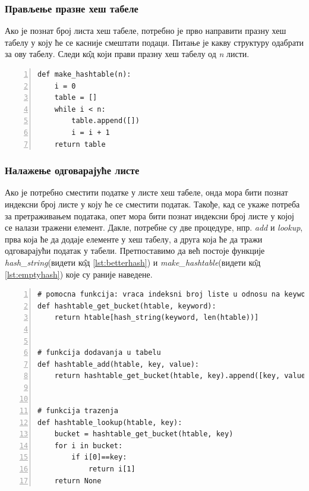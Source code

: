 
\subsubsection{Прављење празне хеш табеле}

Ако је познат број листа хеш табеле, потребно је прво направити празну хеш табелу у коју ће се касније смештати подаци. Питање је какву структуру одабрати за ову табелу. Следи к\^{о}д који прави празну хеш табелу од \emph{n} листи.

\begin{lstlisting}[caption=Празна хеш табела, label={lst:emptyhash}, numbers = left]
def make_hashtable(n):
    i = 0
    table = []
    while i < n:
        table.append([])
        i = i + 1
    return table
\end{lstlisting}

\subsubsection{Налажење одговарајуће листе}

Ако је потребно сместити податке у листе хеш табеле, онда мора бити познат индексни број листе у коју ће се сместити податак. Такође, кад се укаже потреба за  претраживањем података, опет мора бити познат индексни број листе у којој се налази тражени елемент. Дакле, потребне су две процедуре, нпр. \emph{add} и \emph{lookup}, прва која ће да додаје елементе у хеш табелу, а друга која ће да тражи одговарајући податак у табели. Претпоставимо да већ постоје функције \emph{hash\_string}(видети к\^{о}д \ref{lst:betterhash}) и \emph{make\_hashtable}(видети к\^{о}д \ref{lst:emptyhash}) које су раније наведене.

\begin{lstlisting}[caption= \emph{add} и \emph{lookup} функције, label={lst:addlookup}, numbers = left]
# pomocna funkcija: vraca indeksni broj liste u odnosu na keyword
def hashtable_get_bucket(htable, keyword):
    return htable[hash_string(keyword, len(htable))]


# funkcija dodavanja u tabelu
def hashtable_add(htable, key, value):
    return hashtable_get_bucket(htable, key).append([key, value])


# funkcija trazenja
def hashtable_lookup(htable, key):
    bucket = hashtable_get_bucket(htable, key)
    for i in bucket:
        if i[0]==key:
            return i[1]
    return None
\end{lstlisting}

